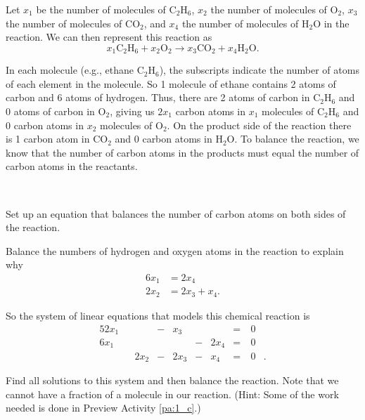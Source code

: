 Let $x_1$ be the number of molecules of $\text{C}_2\text{H}_6$, $x_2$ the number of molecules of $\text{O}_2$, $x_3$ the number of molecules of $\text{CO}_2$, and $x_4$ the number of molecules of $\text{H}_2\text{O}$ in the reaction. We can then represent this reaction as
\[x_1 \text{C}_2\text{H}_6 + x_2 \text{O}_2 \to x_3 \text{CO}_2 + x_4 \text{H}_2\text{O}.\]

In each molecule (e.g., ethane $\text{C}_2\text{H}_6$), the subscripts indicate the number of atoms of each element in the molecule. So 1 molecule of ethane contains 2 atoms of carbon and 6 atoms of hydrogen. Thus, there are 2 atoms of carbon in $\text{C}_2\text{H}_6$ and 0 atoms of carbon in $\text{O}_2$, giving us  $2x_1$ carbon atoms in $x_1$ molecules of $\text{C}_2\text{H}_6$ and 0 carbon atoms in $x_2$ molecules of $\text{O}_2$. On the product side of the reaction there is 1 carbon atom in $\text{CO}_2$ and 0 carbon atoms in $\text{H}_2\text{O} $. To balance the reaction, we know that the number of carbon atoms in the products must equal the number of carbon atoms in the reactants. 

\begin{pactivity} \label{act:1_c_reaction_1} ~
	\ba
	\item Set up an equation that balances the number of carbon atoms on both sides of the reaction.

	\item Balance the numbers of hydrogen and oxygen atoms in the reaction to explain why
\begin{align*}
6x_1 &= 2x_4 \\
2x_2 &= 2x_3 + x_4.
\end{align*}

	\item So the system of linear equations that models this chemical reaction is  \begin{alignat*}{5}
{2}x_1 	&{}		&{}		&{}-{}	&{}x_3	&{}		&{} 			&{}={}	& \ 0&{}   \\
{6}x_1	&{} 		&{} 		&{}		&{}		&{}-{}	&{2}x_4 	&{}={} 	& \ 0&{} \\
{}			&{}		&{2}x_2	&{}-{} 	&{2}x_3	&{}-{}	&{}x_4		&{}={} 	& \ 0&{.}
\end{alignat*}

Find all solutions to this system and then balance the reaction. Note that we cannot have a fraction of a molecule in our reaction.  (Hint: Some of the work needed is done in Preview Activity \ref{pa:1_c}.) 
	\ea

\end{pactivity}

